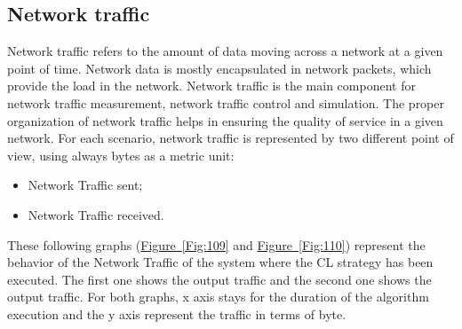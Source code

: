 \documentclass[english, LaM, oneside]{sapthesis}%
\begin{document}
\subsection{Network traffic}
Network traffic refers to the amount of data moving across a network at a given point of time. Network data is mostly encapsulated in network packets, which provide the load in the network. Network traffic is the main component for network traffic measurement, network traffic control and simulation. The proper organization of network traffic helps in ensuring the quality of service in a given network.
For each scenario, network traffic is represented by two different point of view, using always bytes as a metric unit:
\begin{itemize}
    \item Network Traffic sent;
    \item Network Traffic received.
\end{itemize}

These following graphs (\hyperref[Fig:109]{Figure~\ref*{Fig:109}} and \hyperref[Fig:110]{Figure~\ref*{Fig:110}}) represent the behavior of the Network Traffic of the system where the CL strategy has been executed. The first one shows the output traffic and the second one shows the output traffic. For both graphs, x axis stays for the duration of the algorithm execution and the y axis represent the traffic in terms of byte.
\end{document}
